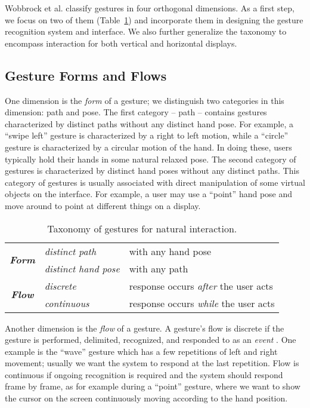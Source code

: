 Wobbrock et al. classify gestures in four orthogonal dimensions. As a first
step, we focus on two of them (Table~\ref{tab:taxonomy}) and incorporate them in
designing the gesture recognition system and interface. We also further generalize the
taxonomy to encompass interaction for both vertical and horizontal displays.

\subsection{Gesture Forms and Flows}
One dimension is the \textit{form} of a gesture; we distinguish two
categories in this dimension: path and pose. The first category -- path --
contains gestures characterized by distinct paths without any distinct
hand pose. For example, a ``swipe left'' gesture is characterized by a
right to left motion, while a ``circle'' gesture is characterized by a
circular motion of the hand. In doing these, users typically hold their
hands in some natural relaxed pose. The second category of gestures is
characterized by distinct hand poses without any distinct paths. This category
of gestures is usually associated with direct manipulation of some virtual
objects on the interface.
For example, a user may use a ``point'' hand pose and move around to
point at different things on a display.

\begin{table}[t]
\caption{Taxonomy of gestures for natural interaction.}
\label{tab:taxonomy}
\centering
\begin{tabular}{|c|l|l|}
\hline
\multirow{2}{*}{\textbf{\textit{Form}}} & \textit{distinct path} & with any hand
pose
\\
\cline{2-3} 
                               & \textit{distinct hand pose} & with any path \\
\hline
\multirow{2}{*}{\textbf{\textit{Flow}}} & \textit{discrete} & response occurs
\textit{after} the user acts \\
\cline{2-3}
              & \textit{continuous} & response occurs \textit{while} the user
              acts \\
\hline
\end{tabular}
\end{table}

Another dimension is the \textit{flow} of a gesture. A gesture's flow is
discrete if the gesture is performed, delimited, recognized, and responded to
as an \textit{event} \cite{wobbrock09}. One example is the ``wave'' gesture
which has a few repetitions of left and right movement; usually we want the system to
respond at the last repetition. Flow is continuous if ongoing recognition is required
and the system should respond frame by frame, as for example during a
``point'' gesture, where we want to show the cursor on the screen
continuously moving according to the hand position. 

